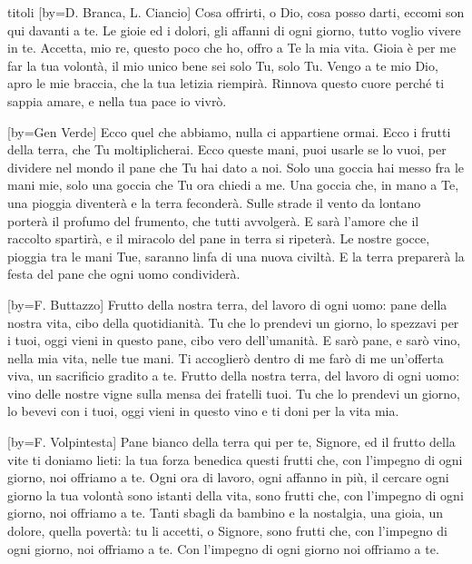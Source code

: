 \begin{songs}{titoli}
[by={D. Branca, L. Ciancio}]
\beginverse
Cosa offrirti, o Dio, cosa posso darti,
eccomi son qui davanti a te.
Le gioie ed i dolori, gli affanni di ogni giorno,
tutto voglio vivere in te.
\endverse
\beginchorus
Accetta, mio re, questo poco che ho,
offro a Te la mia vita.
Gioia è per me far la tua volontà,
il mio unico bene sei solo Tu, solo Tu.
\endchorus
\beginverse
Vengo a te mio Dio, apro le mie braccia,
che la tua letizia riempirà.
Rinnova questo cuore perché ti sappia amare,
e nella tua pace io vivrò.
\endverse
\endsong

[by={Gen Verde}]
\beginverse
Ecco quel che abbiamo, nulla ci appartiene ormai.
Ecco i frutti della terra, che Tu moltiplicherai.
Ecco queste mani, puoi usarle se lo vuoi,
per dividere nel mondo il pane che Tu hai dato a noi.
\endverse
\beginverse
Solo una goccia hai messo fra le mani mie,
solo una goccia che Tu ora chiedi a me.
Una goccia che, in mano a Te, una pioggia diventerà
e la terra feconderà.
\endverse
\beginverse
Sulle strade il vento da lontano porterà
il profumo del frumento, che tutti avvolgerà.
E sarà l'amore che il raccolto spartirà,
e il miracolo del pane in terra si ripeterà.
\endverse
\beginverse
Le nostre gocce, pioggia tra le mani Tue,
saranno linfa di una nuova civiltà.
E la terra preparerà la festa del pane che
ogni uomo condividerà.
\endverse
\endsong

[by={F. Buttazzo}]
\beginverse
Frutto della nostra terra, del lavoro di ogni uomo:
pane della nostra vita, cibo della quotidianità.
Tu che lo prendevi un giorno, lo spezzavi per i tuoi,
oggi vieni in questo pane, cibo vero dell'umanità.
\endverse
\beginchorus
E sarò pane, e sarò vino, nella mia vita, nelle tue mani.
Ti accoglierò dentro di me farò di me un'offerta viva,
un sacrificio gradito a te.
\endchorus
\beginverse
Frutto della nostra terra, del lavoro di ogni uomo:
vino delle nostre vigne sulla mensa dei fratelli tuoi.
Tu che lo prendevi un giorno, lo bevevi con i tuoi,
oggi vieni in questo vino e ti doni per la vita mia.
\endverse
\endsong

[by={F. Volpintesta}]
\beginverse
Pane bianco della terra qui per te, Signore,
ed il frutto della vite ti doniamo lieti:
la tua forza benedica questi frutti che,
con l'impegno di ogni giorno,
noi offriamo a te.
\endverse
\beginverse
Ogni ora di lavoro, ogni affanno in più,
il cercare ogni giorno la tua volontà
sono istanti della vita, sono frutti che,
con l'impegno di ogni giorno,
noi offriamo a te.
\endverse
\beginverse
Tanti sbagli da bambino e la nostalgia,
una gioia, un dolore, quella povertà:
tu li accetti, o Signore, sono frutti che,
con l'impegno di ogni giorno,
noi offriamo a te.
\endverse
\beginverse*
Con l'impegno di ogni giorno
noi offriamo a te.
\endverse
\endsong


\end{songs}
